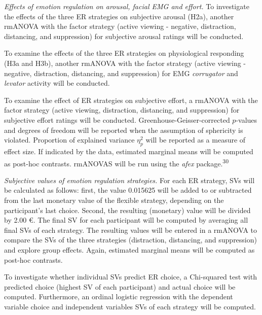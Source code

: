 \documentclass[
  english,
  man,floatsintext]{apa6}
\begin{document}
\emph{Effects of emotion regulation on arousal, facial EMG and effort.}
To investigate the effects of the three ER strategies on subjective arousal (H2a), another rmANOVA with the factor strategy (active viewing - negative, distraction, distancing, and suppression) for subjective arousal ratings will be conducted.

To examine the effects of the three ER strategies on physiological responding (H3a and H3b), another rmANOVA with the factor strategy (active viewing - negative, distraction, distancing, and suppression) for EMG \emph{corrugator} and \emph{levator} activity will be conducted.

To examine the effect of ER strategies on subjective effort, a rmANOVA with the factor strategy (active viewing, distraction, distancing, and suppression) for subjective effort ratings will be conducted.
Greenhouse-Geisser-corrected \(p\)-values and degrees of freedom will be reported when the assumption of sphericity is violated.
Proportion of explained variance \(\eta_{p}^{2}\) will be reported as a measure of effect size.
If indicated by the data, estimated marginal means will be computed as post-hoc contrasts.
rmANOVAS will be run using the \emph{afex} package.\textsuperscript{30}

\emph{Subjective values of emotion regulation strategies.} For each ER strategy, SVs will be calculated as follows: first, the value 0.015625 will be added to or subtracted from the last monetary value of the flexible strategy, depending on the participant's last choice.
Second, the resulting (monetary) value will be divided by 2.00 €.
The final SV for each participant will be computed by averaging all final SVs of each strategy.
The resulting values will be entered in a rmANOVA to compare the SVs of the three strategies (distraction, distancing, and suppression) and explore group effects.
Again, estimated marginal means will be computed as post-hoc contrasts.

To investigate whether individual SVs predict ER choice, a Chi-squared test with predicted choice (highest SV of each participant) and actual choice will be computed.
Furthermore, an ordinal logistic regression with the dependent variable choice and independent variables SVs of each strategy will be computed.
\end{document}

